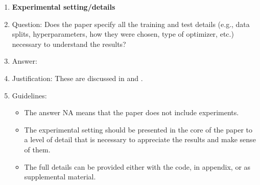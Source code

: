 \documentclass{article}
\begin{document}
{\begin{enumerate}
\item {\bf Experimental setting/details}
    \item[] Question: Does the paper specify all the training and test details (e.g., data splits, hyperparameters, how they were chosen, type of optimizer, etc.) necessary to understand the results?
    \item[] Answer: \answerYes{} %
    \item[] Justification: These are discussed in  and .
    \item[] Guidelines:
    \begin{itemize}
        \item The answer NA means that the paper does not include experiments.
        \item The experimental setting should be presented in the core of the paper to a level of detail that is necessary to appreciate the results and make sense of them.
        \item The full details can be provided either with the code, in appendix, or as supplemental material.
    \end{itemize}


\end{enumerate}}
\end{document}
